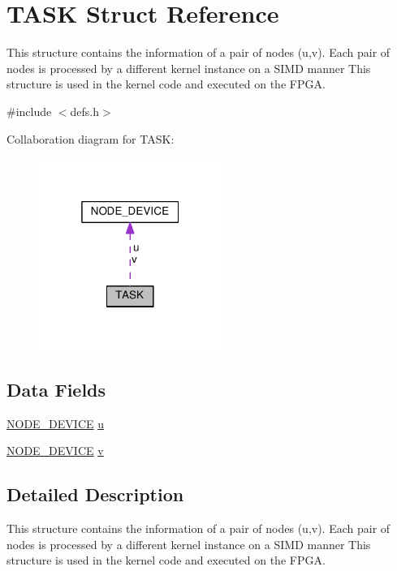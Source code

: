 \hypertarget{structTASK}{}\section{T\+A\+SK Struct Reference}
\label{structTASK}


This structure contains the information of a pair of nodes (u,v). Each pair of nodes is processed by a different kernel instance on a S\+I\+MD manner This structure is used in the kernel code and executed on the F\+P\+GA.  




{\ttfamily \#include $<$defs.\+h$>$}



Collaboration diagram for T\+A\+SK\+:\nopagebreak
\begin{figure}[H]
\begin{center}
\leavevmode
\includegraphics[width=169pt]{structTASK__coll__graph}
\end{center}
\end{figure}
\subsection*{Data Fields}
\begin{DoxyCompactItemize}
\item 
\hyperlink{structNODE__DEVICE}{N\+O\+D\+E\+\_\+\+D\+E\+V\+I\+CE} \hyperlink{structTASK_a40c47e76a10f508bc4757b4e79c65ef1}{u}
\item 
\hyperlink{structNODE__DEVICE}{N\+O\+D\+E\+\_\+\+D\+E\+V\+I\+CE} \hyperlink{structTASK_aa8bc9e3d0203b93cfc0dd927e3972fde}{v}
\end{DoxyCompactItemize}


\subsection{Detailed Description}
This structure contains the information of a pair of nodes (u,v). Each pair of nodes is processed by a different kernel instance on a S\+I\+MD manner This structure is used in the kernel code and executed on the F\+P\+GA. 

